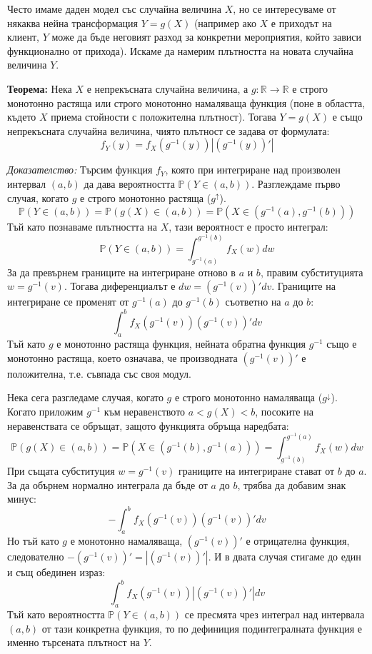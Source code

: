 \documentclass{article}
\begin{document}
Често имаме даден модел със случайна величина $X$, но се интересуваме от някаква нейна трансформация $Y = g(X)$ (например ако $X$ е приходът на клиент, $Y$ може да бъде неговият разход за конкретни мероприятия, който зависи функционално от прихода). Искаме да намерим плътността на новата случайна величина $Y$.

\textbf{Теорема:} Нека $X$ е непрекъсната случайна величина, а $g: \mathbb{R} \to \mathbb{R}$ е строго монотонно растяща или строго монотонно намаляваща функция (поне в областта, където $X$ приема стойности с положителна плътност). Тогава $Y = g(X)$ е също непрекъсната случайна величина, чиято плътност се задава от формулата:
\[
f_Y(y) = f_X(g^{-1}(y)) \left| (g^{-1}(y))' \right|
\]

\emph{Доказателство:} Търсим функция $f_Y$, която при интегриране над произволен интервал $(a, b)$ да дава вероятността $\mathbb{P}(Y \in (a, b))$.
Разглеждаме първо случая, когато $g$ е строго монотонно растяща ($g^{\uparrow}$).
\[
\mathbb{P}(Y \in (a, b)) = \mathbb{P}(g(X) \in (a, b)) = \mathbb{P}(X \in (g^{-1}(a), g^{-1}(b)))
\]
Тъй като познаваме плътността на $X$, тази вероятност е просто интеграл:
\[
\mathbb{P}(Y \in (a, b)) = \int_{g^{-1}(a)}^{g^{-1}(b)} f_X(w) dw
\]
За да превърнем границите на интегриране отново в $a$ и $b$, правим субституцията $w = g^{-1}(v)$. Тогава диференциалът е $dw = (g^{-1}(v))' dv$. Границите на интегриране се променят от $g^{-1}(a)$ до $g^{-1}(b)$ съответно на $a$ до $b$:
\[
\int_{a}^{b} f_X(g^{-1}(v)) (g^{-1}(v))' dv
\]
Тъй като $g$ е монотонно растяща функция, нейната обратна функция $g^{-1}$ също е монотонно растяща, което означава, че производната $(g^{-1}(v))'$ е положителна, т.е. съвпада със своя модул.

Нека сега разгледаме случая, когато $g$ е строго монотонно намаляваща ($g^{\downarrow}$). Когато приложим $g^{-1}$ към неравенството $a < g(X) < b$, посоките на неравенствата се обръщат, защото функцията обръща наредбата:
\[
\mathbb{P}(g(X) \in (a, b)) = \mathbb{P}(X \in (g^{-1}(b), g^{-1}(a))) = \int_{g^{-1}(b)}^{g^{-1}(a)} f_X(w) dw
\]
При същата субституция $w = g^{-1}(v)$ границите на интегриране стават от $b$ до $a$. За да обърнем нормално интеграла да бъде от $a$ до $b$, трябва да добавим знак минус:
\[
-\int_{a}^{b} f_X(g^{-1}(v)) (g^{-1}(v))' dv
\]
Но тъй като $g$ е монотонно намаляваща, $(g^{-1}(v))'$ е отрицателна функция, следователно $-(g^{-1}(v))' = \left| (g^{-1}(v))' \right|$. И в двата случая стигаме до един и същ обединен израз:
\[
\int_{a}^{b} f_X(g^{-1}(v)) \left| (g^{-1}(v))' \right| dv
\]
Тъй като вероятността $\mathbb{P}(Y \in (a, b))$ се пресмята чрез интеграл над интервала $(a,b)$ от тази конкретна функция, то по дефиниция подинтегралната функция е именно търсената плътност на $Y$.
\end{document}
